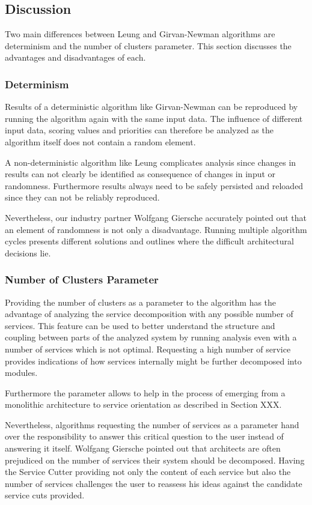 \subsection{Discussion}

Two main differences between Leung and Girvan-Newman algorithms are determinism and the number of clusters parameter. This section discusses the advantages and disadvantages of each.

\subsubsection{Determinism}

Results of a deterministic algorithm like Girvan-Newman can be reproduced by running the algorithm again with the same input data. The influence of different input data, scoring values and priorities can therefore be analyzed as the algorithm itself does not contain a random element.

A non-deterministic algorithm like Leung complicates analysis since changes in results can not clearly be identified as consequence of changes in input or randomness. Furthermore results always need to be safely persisted and reloaded since they can not be reliably reproduced. 

Nevertheless, our industry partner Wolfgang Giersche accurately pointed out that an element of randomness is not only a disadvantage. Running multiple algorithm cycles presents different solutions and outlines where the difficult architectural decisions lie.

\subsubsection{Number of Clusters Parameter}

Providing the number of clusters as a parameter to the algorithm has the advantage of analyzing the service decomposition with any possible number of services. This feature can be used to better understand the structure and coupling between parts of the analyzed system by running analysis even with a number of services which is not optimal. Requesting a high number of service provides indications of how services internally might be further decomposed into modules. 

Furthermore the parameter allows to help in the process of emerging from a monolithic architecture to service orientation as described in Section XXX.

Nevertheless, algorithms requesting the number of services as a parameter hand over the responsibility to answer this critical question to the user instead of answering it itself. Wolfgang Giersche pointed out that architects are often prejudiced on the number of services their system should be decomposed. Having the Service Cutter providing not only the content of each service but also the number of services challenges the user to reassess his ideas against the candidate service cuts provided. 

